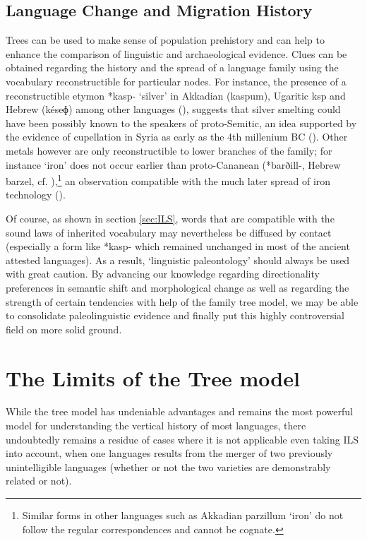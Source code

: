 \documentclass[svgnames,12pt]{scrartcl}
\newcommand{\ipa}[1]{{{\phon\mbox{#1}}}}
\begin{document}
{{\subsection{Language Change and Migration History}
Trees can be used to make sense of population prehistory and can help to enhance the comparison of
linguistic and archaeological evidence. Clues can be obtained regarding the history and the spread
of a language family using the vocabulary reconstructible for particular nodes. 
For instance, the presence of a reconstructible etymon *\ipa{kasp-}  `silver'  in Akkadian (\ipa{kaspum}), Ugaritic \ipa{ksp} and Hebrew (\ipa{késeɸ}) among other languages (\citealt[14-6]{huehnergard12ugaritic}), suggests that silver smelting could have been possibly known to the speakers of proto-Semitic, an idea supported by the evidence of cupellation in Syria as early as the 4th millenium BC  (\citealt{pernicka98silver}). 
Other metals however are only reconstructible to lower branches of the family; for instance `iron'
does not occur earlier than proto-Cananean (*\ipa{barðill-}, Hebrew \ipa{barzel}, cf.
\citealt[287]{kogan15semitic}),\footnote{Similar forms in other languages such as Akkadian
\ipa{parzillum} `iron' do not follow the regular correspondences and cannot be cognate.} an observation compatible with the much later spread of iron technology (\citealt{yahalom15iron}).
 
Of course, as shown in section \ref{sec:ILS}, words that are compatible with the sound laws of
inherited vocabulary may nevertheless be diffused by contact (especially a form like *\ipa{kasp-}
which remained unchanged in most of the ancient attested languages). As a result, `linguistic
paleontology' should always be used with great caution. By advancing our knowledge regarding
directionality preferences in semantic shift and morphological change as well as regarding the
strength of certain tendencies with help of the family tree model, we may be able to consolidate
paleolinguistic evidence and finally put this highly controversial field on more solid ground.



\section{The Limits of the Tree model} \label{sec:limits}
While the tree model has undeniable advantages and remains the most powerful model for understanding the vertical history of most languages, there undoubtedly remains a residue of cases where it is not applicable even taking ILS into account, when one languages results from the merger of two previously unintelligible languages (whether or not the two varieties are demonstrably related or not).

}}
\end{document}
